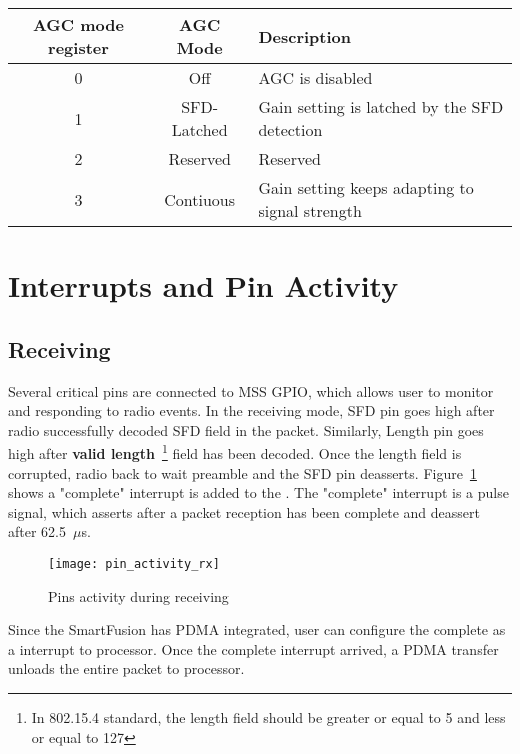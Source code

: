 \begin{table}[h]
\centering
	\begin{tabular}{|c|c|l|}
	\hline
	{\bf AGC mode register} & {\bf AGC Mode} & {\bf Description} \\ \hline
	0 & Off & AGC is disabled\\ \hline
	1 & SFD-Latched & Gain setting is latched by the SFD detection\\ \hline
	2 & Reserved & Reserved\\ \hline
	3 & Contiuous & Gain setting keeps adapting to signal strength\\ \hline
	\end{tabular}
\end{table}

\section{Interrupts and Pin Activity}
\subsection{Receiving}
Several critical pins are connected to MSS GPIO, which allows user to monitor and responding
to radio events. In the receiving mode, SFD pin goes high after radio successfully decoded
SFD field in the packet. Similarly, Length pin goes high after {\bf valid length}~\footnote{
In 802.15.4 standard, the length field should be greater or equal to 5 and less or equal to 127} 
field has been decoded. Once the length field is corrupted, radio back to wait preamble
and the SFD pin deasserts. Figure~\ref{fig:pin_activity_rx} shows a "complete" interrupt is added
to the \sdr. The "complete" interrupt is a pulse signal, which asserts after a packet reception
has been complete and deassert after 62.5~$\mu$s.
\begin{figure}[h]
\centering
	\texttt{[image: pin\_activity\_rx]}
	\caption{Pins activity during receiving}
	\label{fig:pin_activity_rx}
\end{figure}
Since the SmartFusion has PDMA integrated, user can configure the complete as a interrupt to 
processor. Once the complete interrupt arrived, a PDMA transfer unloads the entire packet to
processor.

